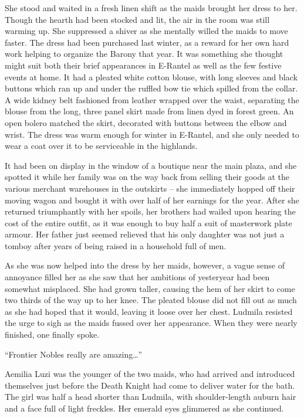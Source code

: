  

She stood and waited in a fresh linen shift as the maids brought her dress to her. Though the hearth had been stocked and lit, the air in the room was still warming up. She suppressed a shiver as she mentally willed the maids to move faster. The dress had been purchased last winter, as a reward for her own hard work helping to organize the Barony that year. It was something she thought might suit both their brief appearances in E-Rantel as well as the few festive events at home. It had a pleated white cotton blouse, with long sleeves and black buttons which ran up and under the ruffled bow tie which spilled from the collar. A wide kidney belt fashioned from leather wrapped over the waist, separating the blouse from the long, three panel skirt made from linen dyed in forest green. An open bolero matched the skirt, decorated with buttons between the elbow and wrist. The dress was warm enough for winter in E-Rantel, and she only needed to wear a coat over it to be serviceable in the highlands.

 

It had been on display in the window of a boutique near the main plaza, and she spotted it while her family was on the way back from selling their goods at the various merchant warehouses in the outskirts – she immediately hopped off their moving wagon and bought it with over half of her earnings for the year. After she returned triumphantly with her spoils, her brothers had wailed upon hearing the cost of the entire outfit, as it was enough to buy half a suit of masterwork plate armour. Her father just seemed relieved that his only daughter was not just a tomboy after years of being raised in a household full of men.

 

As she was now helped into the dress by her maids, however, a vague sense of annoyance filled her as she saw that her ambitions of yesteryear had been somewhat misplaced. She had grown taller, causing the hem of her skirt to come two thirds of the way up to her knee. The pleated blouse did not fill out as much as she had hoped that it would, leaving it loose over her chest. Ludmila resisted the urge to sigh as the maids fussed over her appearance. When they were nearly finished, one finally spoke.

 

“Frontier Nobles really are amazing…”

 

Aemilia Luzi was the younger of the two maids, who had arrived and introduced themselves just before the Death Knight had come to deliver water for the bath. The girl was half a head shorter than Ludmila, with shoulder-length auburn hair and a face full of light freckles. Her emerald eyes glimmered as she continued.

